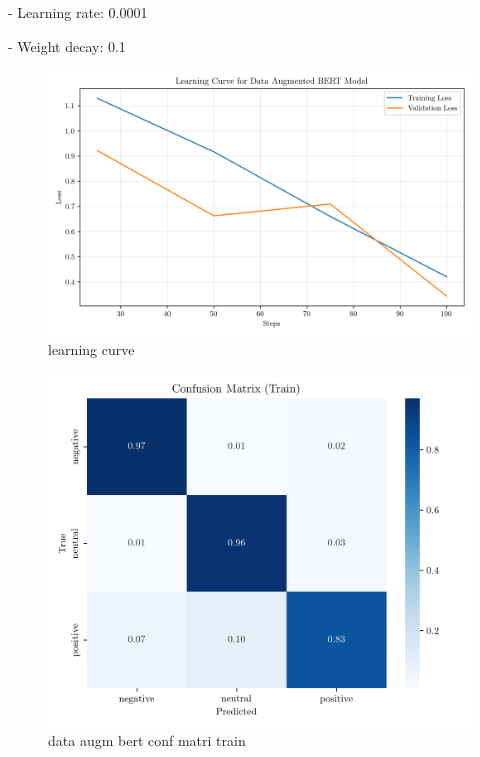 \documentclass[conference]{IEEEtran}
\begin{document}
- Learning rate: 0.0001

- Weight decay: 0.1

\begin{figure}[H]
    \centering
    \includegraphics[width=1\linewidth]{assets/data_augmented_bert_learninc_curve.png}
    \caption{learning curve}
    \label{fig:data_augmented_bert_learninc_curve}
\end{figure}

\begin{figure}[H]
    \centering
    \includegraphics[width=1\linewidth]{assets/dataaugmented_bert_confusion_matrix_Train.png}
    \caption{data augm bert conf matri train}
    \label{fig:dataaugmented_bert_confusion_matrix_Train}
\end{figure}
\end{document}
